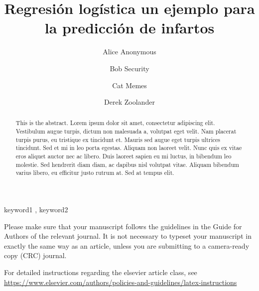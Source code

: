 \documentclass[
  super,
  preprint,
  3p]{elsarticle}
\begin{document}
\begin{frontmatter}
\title{Regresión logística un ejemplo para la predicción de infartos}
\author[1]{Alice Anonymous%
%
}
\author[2]{Bob Security%
%
}
\author[2]{Cat Memes%
%
}
\author[]{Derek Zoolander%
%
}



        
\begin{abstract}
This is the abstract. Lorem ipsum dolor sit amet, consectetur adipiscing
elit. Vestibulum augue turpis, dictum non malesuada a, volutpat eget
velit. Nam placerat turpis purus, eu tristique ex tincidunt et. Mauris
sed augue eget turpis ultrices tincidunt. Sed et mi in leo porta
egestas. Aliquam non laoreet velit. Nunc quis ex vitae eros aliquet
auctor nec ac libero. Duis laoreet sapien eu mi luctus, in bibendum leo
molestie. Sed hendrerit diam diam, ac dapibus nisl volutpat vitae.
Aliquam bibendum varius libero, eu efficitur justo rutrum at. Sed at
tempus elit.
\end{abstract}





\begin{keyword}
    keyword1 \sep 
    keyword2
\end{keyword}
\end{frontmatter}
    

Please make sure that your manuscript follows the guidelines in the
Guide for Authors of the relevant journal. It is not necessary to
typeset your manuscript in exactly the same way as an article, unless
you are submitting to a camera-ready copy (CRC) journal.

For detailed instructions regarding the elsevier article class, see
\url{https://www.elsevier.com/authors/policies-and-guidelines/latex-instructions}
\end{document}
